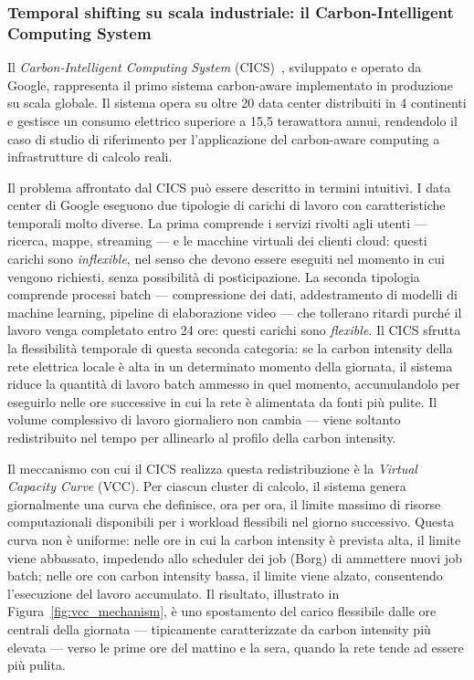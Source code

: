  
\subsubsection{Temporal shifting su scala industriale: il Carbon-Intelligent Computing System}
\label{subsubsec:google_cics}
 
Il \emph{Carbon-Intelligent Computing System}
(CICS)~\cite{radovanovic2022carbon}, sviluppato e operato da Google,
rappresenta il primo sistema carbon-aware implementato in produzione su
scala globale. Il sistema opera su oltre 20 data center distribuiti in
4 continenti e gestisce un consumo elettrico superiore a 15,5 terawattora
annui, rendendolo il caso di studio di riferimento per l'applicazione
del carbon-aware computing a infrastrutture di calcolo reali.
 
Il problema affrontato dal CICS può essere descritto in termini
intuitivi. I data center di Google eseguono due tipologie di carichi di
lavoro con caratteristiche temporali molto diverse. La prima comprende i
servizi rivolti agli utenti --- ricerca, mappe, streaming --- e le
macchine virtuali dei clienti cloud: questi carichi sono
\emph{inflexible}, nel senso che devono essere eseguiti nel momento in
cui vengono richiesti, senza possibilità di posticipazione. La seconda
tipologia comprende processi batch --- compressione dei dati,
addestramento di modelli di machine learning, pipeline di elaborazione
video --- che tollerano ritardi purché il lavoro venga completato entro
24 ore: questi carichi sono \emph{flexible}. Il CICS sfrutta la
flessibilità temporale di questa seconda categoria: se la carbon
intensity della rete elettrica locale è alta in un determinato momento
della giornata, il sistema riduce la quantità di lavoro batch ammesso
in quel momento, accumulandolo per eseguirlo nelle ore successive in
cui la rete è alimentata da fonti più pulite. Il volume complessivo di
lavoro giornaliero non cambia --- viene soltanto redistribuito nel tempo
per allinearlo al profilo della carbon intensity.
 
Il meccanismo con cui il CICS realizza questa redistribuzione è la
\emph{Virtual Capacity Curve} (VCC). Per ciascun cluster di calcolo, il
sistema genera giornalmente una curva che definisce, ora per ora, il
limite massimo di risorse computazionali disponibili per i workload
flessibili nel giorno successivo. Questa curva non è uniforme: nelle
ore in cui la carbon intensity è prevista alta, il limite viene
abbassato, impedendo allo scheduler dei job (Borg) di ammettere nuovi
job batch; nelle ore con carbon intensity bassa, il limite viene alzato,
consentendo l'esecuzione del lavoro accumulato. Il risultato, illustrato
in Figura~\ref{fig:vcc_mechanism}, è uno spostamento del carico
flessibile dalle ore centrali della giornata --- tipicamente
caratterizzate da carbon intensity più elevata --- verso le prime ore
del mattino e la sera, quando la rete tende ad essere più pulita.
 
